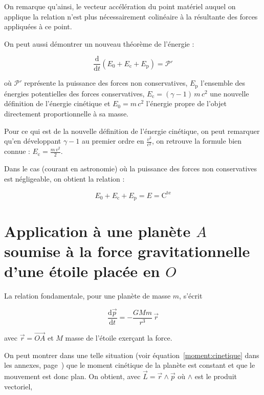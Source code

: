 \documentclass[12pt,a4paper]{article}
\newcommand{\dd}{\text{d}}
\newcommand{\ddt}[1]{\frac{\dd #1}{\dd t}}
\newcommand{\pa}[1]{\left(#1\right)}
\newcommand{\cte}{\text{C}^{\text{te}}}
\newcommand{\e}[1]{_{\text{#1}}}
\newcommand{\vectoriel}{\wedge}
\begin{document}
On remarque qu'ainsi, le vecteur accélération du point matériel
auquel on applique la relation n'est plus nécessairement colinéaire
à la résultante des forces appliquées à ce point.

    On peut aussi démontrer un nouveau théorème de l'énergie : 

\begin{equation}
    \ddt{}\!\pa{E_0 + E\e{c} + E\e{p}} = \mathcal{P}'
\end{equation}

\noindent où $\mathcal{P}'$ représente la puissance des forces non
conservatives, $E\e{p}$ l'ensemble des énergies potentielles des forces
conservatives, $E\e{c} = (\gamma - 1)\, m\, c^2$ une nouvelle définition de
l'énergie cinétique et $E_0=m\, c^2$ l'énergie propre de l'objet
directement proportionnelle à sa masse.
    
    Pour ce qui est de la nouvelle définition de l'énergie
cinétique, on peut remarquer qu'en développant $\gamma - 1$ au premier
ordre en $\frac{v^2}{c^2}$, on retrouve la formule bien connue : $E\e{c} =
\frac{m\, v^2}{2}$.

    Dans le cas (courant en astronomie) où la puissance des forces
non conservatives est négligeable, on obtient la relation :
    
\begin{equation}
    E_0 + E\e{c} + E\e{p} = E = \cte
\end{equation}

    \section{Application à une planète $A$ soumise à la force
gravitationnelle d'une étoile placée en $O$}

La relation fondamentale, pour une planète de masse $m$, s'écrit 

\begin{equation}
    \ddt{\vec{p}} = -\frac{G M m}{r^3}\, \vec{r}
\end{equation}

\noindent
avec $\vec{r} = \overrightarrow{OA}$ et $M$ masse de l'étoile exerçant la
force.

    On peut montrer dans une telle situation (voir équation~\ref{moment:cinetique} dans les annexes, page~\pageref{moment:cinetique})
que le moment cinétique de la planète est constant et que le mouvement
est donc plan. On obtient, avec $\vec{L} = \vec{r}\vectoriel\vec{p}$
où $\vectoriel$ est le produit vectoriel,
\end{document}
